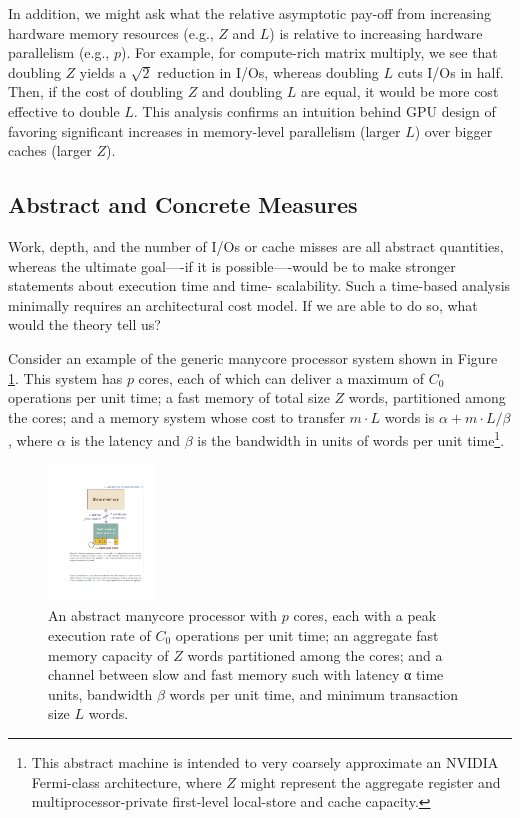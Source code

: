 \documentclass[twocolumn]{article}
\begin{document}
In addition, we might ask what the relative asymptotic pay-off from increasing hardware memory resources
 (e.g., $Z$ and $L$) is relative to increasing hardware parallelism (e.g., $p$). 
For example, for compute-rich matrix multiply, we see that doubling $Z$ yields a $\sqrt{2}$ reduction in I/Os, whereas doubling $L$ cuts I/Os in half. Then, if the cost of doubling $Z$ and doubling $L$ are equal, it would be more cost effective to double $L$. This analysis confirms an intuition behind GPU design of favoring significant increases in memory-level parallelism (larger $L$) over bigger caches (larger $Z$).

\subsection{Abstract and Concrete Measures}
Work, depth, and the number of I/Os or cache misses are all abstract quantities, whereas the ultimate goal—-if it is possible—-would be to make stronger statements about execution time and time- scalability. Such a time-based analysis minimally requires an architectural cost model. If we are able to do so, what would the theory tell us?

Consider an example of the generic manycore processor system shown in Figure \ref{fig:manycore}. 
This system has $p$ cores, each of which can deliver a maximum of $C_0$ operations per unit time; a fast memory of total size $Z$ words, partitioned among the cores; and a memory system whose cost to transfer $m \cdot L$ words is $\alpha + m \cdot L/\beta$, where $\alpha$ is the latency and $\beta$ is the bandwidth in units of words per unit time\footnote{This abstract machine is intended to very coarsely approximate an NVIDIA Fermi-class architecture, where $Z$ might represent the aggregate register and multiprocessor-private first-level local-store and cache capacity.}.
\begin{figure}[htb]
        \centering
        \includegraphics[width=0.25\textwidth]{manycore-processor.pdf}
        \caption{An abstract manycore processor with $p$ cores, each with a peak execution rate of $C_0$ operations per unit time; an aggregate fast memory capacity of $Z$ words partitioned among the cores; and a channel between slow and fast memory such with latency α time units, bandwidth $\beta$ words per unit time, and minimum transaction size $L$ words.}
        \label{fig:manycore}
\end{figure}
\end{document}
